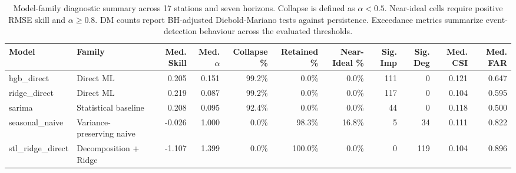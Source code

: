 \begin{landscape}
\begin{table}[p]
\centering
\small
\setlength{\tabcolsep}{5pt}
\caption{Model-family diagnostic summary across 17 stations and seven horizons. Collapse is defined as $\alpha < 0.5$. Near-ideal cells require positive RMSE skill and $\alpha \geq 0.8$. DM counts report BH-adjusted Diebold-Mariano tests against persistence. Exceedance metrics summarize event-detection behaviour across the evaluated thresholds.}
\label{tab:five_model_diagnostic_summary}
\begin{tabular}{llrrrrrrrrr}
\toprule
Model & Family & Med. Skill & Med. $\alpha$ & Collapse \% & Retained \% & Near-Ideal \% & Sig. Imp & Sig. Deg & Med. CSI & Med. FAR \\
\midrule
hgb\_direct & Direct ML & 0.205 & 0.151 & 99.2\% & 0.0\% & 0.0\% & 111 & 0 & 0.121 & 0.647 \\
ridge\_direct & Direct ML & 0.219 & 0.087 & 99.2\% & 0.0\% & 0.0\% & 117 & 0 & 0.104 & 0.595 \\
sarima & Statistical baseline & 0.208 & 0.095 & 92.4\% & 0.0\% & 0.0\% & 44 & 0 & 0.118 & 0.500 \\
seasonal\_naive & Variance-preserving naive & -0.026 & 1.000 & 0.0\% & 98.3\% & 16.8\% & 5 & 34 & 0.111 & 0.822 \\
stl\_ridge\_direct & Decomposition + Ridge & -1.107 & 1.399 & 0.0\% & 100.0\% & 0.0\% & 0 & 119 & 0.104 & 0.896 \\
\bottomrule
\end{tabular}
\end{table}
\end{landscape}
